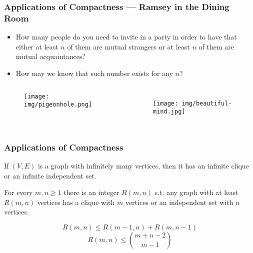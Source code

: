 \documentclass[UTF8,aspectratio=43,11pt,colorlinks,compress,openany]{beamer}%
\begin{document}
\begin{frame}\frametitle{\small Applications of Compactness --- Ramsey in the Dining Room}
	\begin{problem}
		\begin{itemize}
			\item How many people do you need to invite in a party in order to have that either at least $n$ of them are mutual strangers or at least $n$ of them are mutual acquaintances?
			\item How may we know that such number exists for any $n$?
		\end{itemize}
	\end{problem}
	\begin{columns}
			\begin{center}
				\begin{figure}
					\texttt{[image: img/pigeonhole.png]}
				\end{figure}
			\end{center}
			\begin{center}\vspace{-7pt}
			\end{center}
		\begin{figure}
		\texttt{[image: img/beautiful-mind.jpg]}
		\end{figure}
	\end{columns}
\end{frame}

\begin{frame}\frametitle{Applications of Compactness}
	\begin{theorem}
		If $(V,E)$ is a graph with infinitely many vertices, then it has an infinite clique or an infinite independent set.
	\end{theorem}
	\begin{theorem}
		For every $m,n\geq 1$ there is an integer $R(m,n)$ s.t. any graph with at least $R(m,n)$ vertices has a clique with $m$ vertices or an independent set with $n$ vertices.
	\end{theorem}
	\vspace{-2ex}
	\[R(m,n)\leq R(m-1,n)+R(m,n-1)\]
	\[R(m,n)\leq \binom{m+n-2}{m-1}\]
\end{frame}
\end{document}
